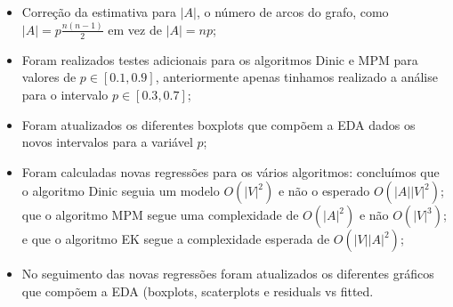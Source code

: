 \documentclass{uofa-eng-assignment}
\begin{document}
\begin{itemize}
    \item Correção da estimativa para $|A|$, o número de arcos do grafo, como $|A|=p\frac{n(n-1)}{2}$ em vez de $|A|=np$;
    \item Foram realizados testes adicionais para os algoritmos Dinic e MPM para valores de $p \in [0.1, 0.9]$, anteriormente apenas tinhamos realizado a análise para o intervalo $p \in [0.3, 0.7]$;
    \item Foram atualizados os diferentes boxplots que compõem a EDA dados os novos intervalos para a variável $p$;
    \item Foram calculadas novas regressões para os vários algoritmos: concluímos que o algoritmo Dinic seguia um modelo $O(|V|^2)$ e não o esperado $O(|A||V|^2)$; que o algoritmo MPM segue uma complexidade de $O(|A|^2)$ e não $O(|V|^3)$; e que o algoritmo EK segue a complexidade esperada de $O(|V||A|^2)$;
    \item No seguimento das novas regressões foram atualizados os diferentes gráficos que compõem a EDA (boxplots, scaterplots e residuals vs fitted.
\end{itemize}
\end{document}
